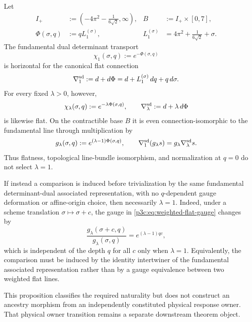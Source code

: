 \documentclass[12pt,a4paper]{article}
\begin{document}
\begin{proposition}
\label{p3c:prop:full-scheme-depth-determinant-connection}
Let
\[
\begin{aligned}
 I_+&:=\left(-4\pi^2-\frac1{6\sqrt2},\infty\right),
 & B&:=I_+\times[0,7],\\
 \Phi(\sigma,q)&:=qL_1^{(\sigma)},
 & L_1^{(\sigma)}&=4\pi^2+\frac1{6\sqrt2}+\sigma .
\end{aligned}
\]
The fundamental dual determinant transport
\[
 \chi_1(\sigma,q):=e^{-\Phi(\sigma,q)}
\]
is horizontal for the canonical flat connection
\begin{equation}
 \label{p3c:eq:full-scheme-depth-determinant-connection}
 \nabla^{\rm sd}_1:=d+d\Phi
 =d+L_1^{(\sigma)}\,dq+q\,d\sigma .
\end{equation}
For every fixed $\lambda>0$, however,
\[
 \chi_\lambda(\sigma,q):=e^{-\lambda\Phi(\sigma,q)},
 \qquad
 \nabla^{\rm sd}_\lambda:=d+\lambda\,d\Phi
\]
is likewise flat.  On the contractible base $B$ it is even
connection-isomorphic to the fundamental line through multiplication by
\begin{equation}
 \label{p3c:eq:weighted-flat-gauge}
 g_\lambda(\sigma,q)
 :=e^{(\lambda-1)\Phi(\sigma,q)},
 \qquad
 \nabla^{\rm sd}_1(g_\lambda s)=g_\lambda\nabla^{\rm sd}_\lambda s .
\end{equation}
Thus flatness, topological line-bundle isomorphism, and normalization at
$q=0$ do not select $\lambda=1$.

If instead a comparison is induced before trivialization by the same
fundamental determinant-dual associated representation, with no
$q$-dependent gauge deformation or affine-origin choice, then necessarily
$\lambda=1$.  Indeed, under a scheme translation $\sigma\mapsto\sigma+c$,
the gauge in \eqref{p3c:eq:weighted-flat-gauge} changes by
\[
 \frac{g_\lambda(\sigma+c,q)}{g_\lambda(\sigma,q)}
 =e^{(\lambda-1)qc},
\]
which is independent of the depth $q$ for all $c$ only when $\lambda=1$.
Equivalently, the comparison must be induced by the identity intertwiner of
the fundamental associated representation rather than by a gauge equivalence
between two weighted flat lines.

This proposition classifies the required naturality but does not construct an
ancestry morphism from an independently constituted physical response owner.
That physical owner transition remains a separate downstream theorem object.
\end{proposition}
\end{document}
